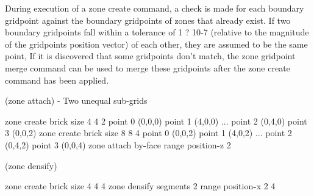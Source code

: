 \documentclass[a4paper, nobind]{templates/ociamthesis}
\newenvironment{Shaded}{\begin{snugshade}}{\end{snugshade}}
\newcommand{\BuiltInTok}[1]{#1}
\newcommand{\DecValTok}[1]{\textcolor[rgb]{0.00,0.00,0.81}{#1}}
\newcommand{\NormalTok}[1]{#1}
\newcommand{\OperatorTok}[1]{\textcolor[rgb]{0.81,0.36,0.00}{\textbf{#1}}}
\renewenvironment{Shaded}
{
  \vspace{10pt}%
  \begin{snugshade}%
}{%
  \end{snugshade}%
  \vspace{8pt}%
}
\begin{document}
During execution of a zone create command, a check is made for each boundary gridpoint against the boundary gridpoints of zones that already exist.
If two boundary gridpoints fall within a tolerance of 1 ? 10-7 (relative to the magnitude of the gridpoints position vector) of each other, they are assumed to be the same point,
If it is discovered that some gridpoints don't match, the zone gridpoint merge command can be used to merge these gridpoints after the zone create command has been applied.

(zone attach) - Two unequal sub-grids

\begin{Shaded}
\begin{Highlighting}[]
\NormalTok{zone create brick size }\DecValTok{4} \DecValTok{4} \DecValTok{2}\NormalTok{ point }\DecValTok{0}\NormalTok{ (}\DecValTok{0}\NormalTok{,}\DecValTok{0}\NormalTok{,}\DecValTok{0}\NormalTok{) point }\DecValTok{1}\NormalTok{ (}\DecValTok{4}\NormalTok{,}\DecValTok{0}\NormalTok{,}\DecValTok{0}\NormalTok{) ...}
\NormalTok{                             point }\DecValTok{2}\NormalTok{ (}\DecValTok{0}\NormalTok{,}\DecValTok{4}\NormalTok{,}\DecValTok{0}\NormalTok{) point }\DecValTok{3}\NormalTok{ (}\DecValTok{0}\NormalTok{,}\DecValTok{0}\NormalTok{,}\DecValTok{2}\NormalTok{)}
\NormalTok{zone create brick size }\DecValTok{8} \DecValTok{8} \DecValTok{4}\NormalTok{ point }\DecValTok{0}\NormalTok{ (}\DecValTok{0}\NormalTok{,}\DecValTok{0}\NormalTok{,}\DecValTok{2}\NormalTok{) point }\DecValTok{1}\NormalTok{ (}\DecValTok{4}\NormalTok{,}\DecValTok{0}\NormalTok{,}\DecValTok{2}\NormalTok{) ...}
\NormalTok{                             point }\DecValTok{2}\NormalTok{ (}\DecValTok{0}\NormalTok{,}\DecValTok{4}\NormalTok{,}\DecValTok{2}\NormalTok{) point }\DecValTok{3}\NormalTok{ (}\DecValTok{0}\NormalTok{,}\DecValTok{0}\NormalTok{,}\DecValTok{4}\NormalTok{)}
\NormalTok{zone attach by}\OperatorTok{{-}}\NormalTok{face }\BuiltInTok{range}\NormalTok{ position}\OperatorTok{{-}}\NormalTok{z }\DecValTok{2}
\end{Highlighting}
\end{Shaded}

(zone densify)

\begin{Shaded}
\begin{Highlighting}[]
\NormalTok{zone create brick size }\DecValTok{4} \DecValTok{4} \DecValTok{4}
\NormalTok{zone densify segments }\DecValTok{2} \BuiltInTok{range}\NormalTok{ position}\OperatorTok{{-}}\NormalTok{x }\DecValTok{2} \DecValTok{4}
\end{Highlighting}
\end{Shaded}
\end{document}
